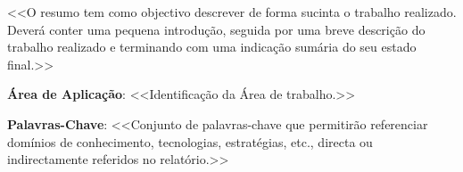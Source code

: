 \documentclass[a4paper,12pt]{scrreprt}
\begin{document}




\makecover






\renewenvironment{abstract}
 {\par\noindent\textbf{\Large\abstractname}\par\bigskip}
 {}

\begin{flushleft}
\begin{abstract}
    <<O resumo tem como objectivo descrever de forma sucinta o trabalho realizado. Deverá conter uma pequena introdução, seguida por uma breve descrição do trabalho realizado e terminando com uma indicação sumária do seu estado final.>>
    \par \textbf{Área de Aplicação}: <<Identificação da Área de trabalho.>>
    \par \textbf{Palavras-Chave}: <<Conjunto de palavras-chave que permitirão referenciar domínios de conhecimento, tecnologias, estratégias, etc., directa ou indirectamente referidos no relatório.>>
\end{abstract}
\end{flushleft}

\pagebreak




\renewcommand{\contentsname}{Índice}
\renewcommand{\listfigurename}{Índice de Figuras}
\renewcommand{\listtablename}{Índice de Tabelas}
\renewcommand{\lstlistlistingname}{Índice de \textit{Snippets}}
\end{document}
